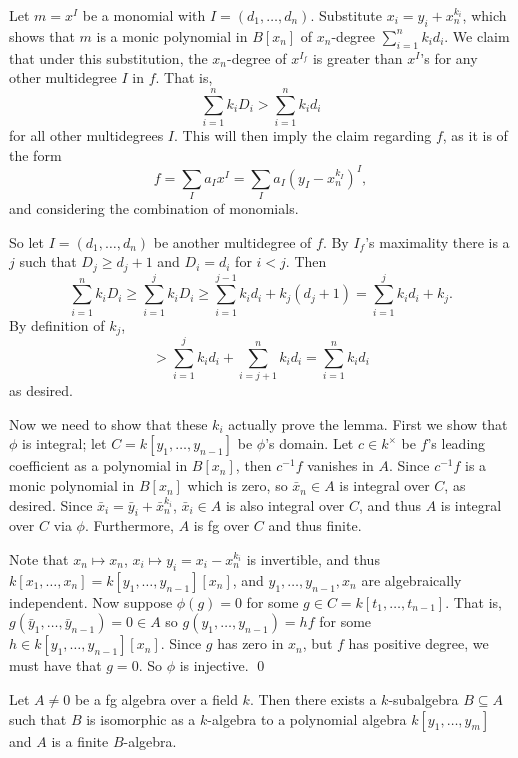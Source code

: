     Let $m=x^I$ be a monomial with $I=(d_1,\dots,d_n)$.
    Substitute $x_i=y_i+x_n^{k_i}$, which shows that $m$ is a monic polynomial in $B[x_n]$ of $x_n$-degree $\sum_{i=1}^nk_id_i$.
    We claim that under this substitution, the $x_n$-degree of $x^{I_f}$ is greater than $x^I$'s for any other multidegree $I$ in $f$.
    That is,
    $$ \sum_{i=1}^n k_iD_i > \sum_{i=1}^n k_id_i $$
    for all other multidegrees $I$.
    This will then imply the claim regarding $f$, as it is of the form
    $$ f = \sum_I a_Ix^I = \sum_I a_I(y_I-x_n^{k_I})^I , $$
    and considering the combination of monomials.

    So let $I=(d_1,\dots,d_n)$ be another multidegree of $f$.
    By $I_f$'s maximality there is a $j$ such that $D_j\geq d_j+1$ and $D_i=d_i$ for $i<j$.
    Then
    $$ \sum_{i=1}^nk_iD_i \geq \sum_{i=1}^jk_iD_i \geq \sum_{i=1}^{j-1}k_id_i + k_j(d_j+1) = \sum_{i=1}^jk_id_i + k_j . $$
    By definition of $k_j$,
    $$ > \sum_{i=1}^jk_id_i + \sum_{i=j+1}^nk_id_i = \sum_{i=1}^nk_id_i $$
    as desired.

    Now we need to show that these $k_i$ actually prove the lemma.
    First we show that $\phi$ is integral; let $C=k[y_1,\dots,y_{n-1}]$ be $\phi$'s domain.
    Let $c\in k^\times$ be $f$'s leading coefficient as a polynomial in $B[x_n]$, then $c^{-1}f$ vanishes in $A$.
    Since $c^{-1}f$ is a monic polynomial in $B[x_n]$ which is zero, so $\bar x_n\in A$ is integral over $C$, as desired.
    Since $\bar x_i=\bar y_i+\bar x_n^{k_i}$, $\bar x_i\in A$ is also integral over $C$, and thus $A$ is integral over $C$ via $\phi$.
    Furthermore, $A$ is fg over $C$ and thus finite.

    Note that $x_n\mapsto x_n$, $x_i\mapsto y_i=x_i-x_n^{k_i}$ is invertible, and thus $k[x_1,\dots,x_n]=k[y_1,\dots,y_{n-1}][x_n]$,
    and $y_1,\dots,y_{n-1},x_n$ are algebraically independent.
    Now suppose $\phi(g)=0$ for some $g\in C=k[t_1,\dots,t_{n-1}]$.
    That is, $g(\bar y_1,\dots,\bar y_{n-1})=0\in A$ so $g(y_1,\dots,y_{n-1})=hf$ for some $h\in k[y_1,\dots,y_{n-1}][x_n]$.
    Since $g$ has zero in $x_n$, but $f$ has positive degree, we must have that $g=0$.
    So $\phi$ is injective.
    \qed

\eproof

\bthrm[title=Noether normalization lemma]

    Let $A\neq0$ be a fg algebra over a field $k$.
    Then there exists a $k$-subalgebra $B\subseteq A$ such that $B$ is isomorphic as a $k$-algebra to a polynomial algebra $k[y_1,\dots,y_m]$
    and $A$ is a finite $B$-algebra.

